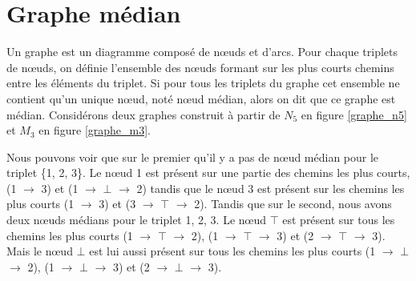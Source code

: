 \section{Graphe médian}

Un graphe est un diagramme composé de n\oe uds et d'arcs. Pour chaque triplets de n\oe uds, on définie l'ensemble des n\oe uds formant sur les plus courts chemins entre les éléments du triplet. Si pour tous les triplets du graphe cet ensemble ne contient qu'un unique n\oe ud, noté n\oe ud médian, alors on dit que ce graphe est médian. Considérons deux graphes construit à partir de $N_5$ en figure \ref{graphe_n5} et $M_3$ en figure \ref{graphe_m3}.

\smallbreak

Nous pouvons voir que sur le premier qu'il y a pas de n\oe ud médian pour le triplet \{1, 2, 3\}. Le n\oe ud 1 est présent sur une partie des chemins les plus courts, (1 $\rightarrow$ 3) et (1 $\rightarrow$ $\bot$ $\rightarrow$ 2) tandis que le n\oe ud 3 est présent sur les chemins les plus courts (1 $\rightarrow$ 3) et (3 $\rightarrow$ $\top$ $\rightarrow$ 2). Tandis que sur le second, nous avons deux n\oe uds médians pour le triplet {1, 2, 3}. Le n\oe ud $\top$ est présent sur tous les chemins les plus courts (1 $\rightarrow$ $\top$ $\rightarrow$ 2), (1 $\rightarrow$ $\top$ $\rightarrow$ 3) et (2 $\rightarrow$ $\top$ $\rightarrow$ 3). Mais le n\oe ud $\bot$ est lui aussi présent sur tous les chemins les plus courts (1 $\rightarrow$ $\bot$ $\rightarrow$ 2), (1 $\rightarrow$ $\bot$ $\rightarrow$ 3) et (2 $\rightarrow$ $\bot$ $\rightarrow$ 3).

